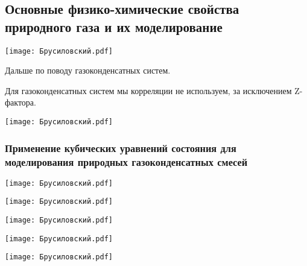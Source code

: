 \documentclass[main.tex]{subfiles}
\begin{document}
\subsection[\underline{\textbf{Основные физико-химические свойства природного газа и их моделирование}}]{Основные физико-химические свойства природного газа и их моделирование}

\begin{center}
\texttt{[image: Брусиловский.pdf]}
\end{center}

Дальше по поводу газоконденсатных систем.

Для газоконденсатных систем мы корреляции не используем, за исключением Z-фактора.

\begin{center}
\texttt{[image: Брусиловский.pdf]}
\end{center}



\subsubsection{Применение кубических уравнений состояния для моделирования природных газоконденсатных смесей}

\begin{center}
\texttt{[image: Брусиловский.pdf]}
\end{center}



\begin{center}
\texttt{[image: Брусиловский.pdf]}
\end{center}



\begin{center}
\texttt{[image: Брусиловский.pdf]}
\end{center}



\begin{center}
\texttt{[image: Брусиловский.pdf]}
\end{center}



\begin{center}
\texttt{[image: Брусиловский.pdf]}
\end{center}
\end{document}
